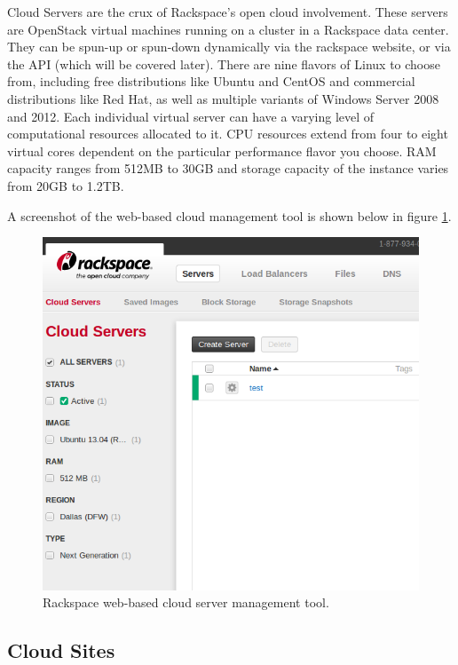 \documentclass[DIV=calc, paper=letter, fontsize=12pt, twocolumn]{scrartcl}	 %
\begin{document}
Cloud Servers are the crux of Rackspace's open cloud involvement. These servers are
OpenStack virtual machines running on a cluster in a Rackspace data center.
They can be spun-up or spun-down dynamically via the rackspace website, or via
the API (which will be covered later). There are nine flavors of Linux to choose
from, including free distributions like Ubuntu and CentOS and commercial distributions
like Red Hat, as well as multiple variants of Windows Server 2008 and 2012. Each
individual virtual server can have a varying level of computational resources 
allocated to it. CPU resources extend from four to eight virtual cores dependent
on the particular performance flavor you choose. RAM capacity ranges from 512MB
to 30GB and storage capacity of the instance varies from 20GB to 1.2TB.

A screenshot of the web-based cloud management tool is shown below in 
figure \ref{fig:cloudinterface}.

\begin{figure}[ht!]
\centering
\includegraphics[width=\columnwidth]{cloudinterface.png}
\caption{Rackspace web-based cloud server management tool.}
\label{fig:cloudinterface}
\end{figure}

\subsection*{Cloud Sites}
\end{document}

